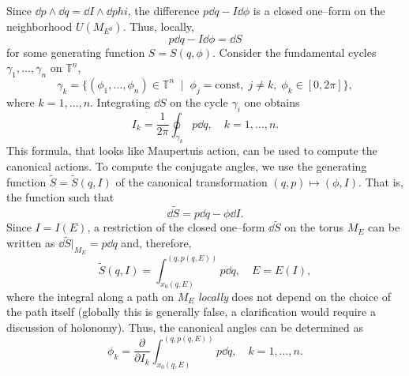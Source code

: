\documentclass[english,fontsize=11pt,paper=b5]{scrbook}
\theoremstyle{definition}
\begin{document}
      Since $\dd{p} \wedge \dd {q} = \dd{I} \wedge \dd {phi}$, the difference $p\dd q - I\dd \phi$ is a closed one--form on the neighborhood $U(M_{E^0})$. Thus, locally,
      \begin{equation}
        p\dd{q} - I\dd{\phi} = \dd{S}
      \end{equation}
      for some generating function $S = S(q,\phi)$.
      Consider the fundamental cycles $\gamma_1, \ldots, \gamma_n$ on $\mathbb{T}^n$,
      \begin{equation}
        \gamma_k = \big\{
          (\phi_1, \ldots, \phi_n) \in \mathbb{T}^n \;\mid\; \phi_j = \mathrm{const}, \; j\neq k,\; \phi_k \in [0,2\pi]
        \big\},
      \end{equation}
      where $k=1,\ldots,n$.
      Integrating $\dd S$ on the cycle $\gamma_i$ one obtains
      \begin{equation}
        I_k = \frac1{2\pi} \oint_{\gamma_k} p \dd{q}, \quad k=1,\ldots,n.
      \end{equation}
      This formula, that looks like Maupertuis action, can be used to compute the canonical actions.
      To compute the conjugate angles, we use the generating function $\widetilde S = \widetilde S(q,I)$ of the canonical transformation $(q,p) \mapsto (\phi, I)$. That is, the function such that
      \begin{equation}
        \dd{\widetilde{S}} = p\dd{q} - \phi \dd{I}.
      \end{equation}
      Since $I = I(E)$, a restriction of the closed one--form $\dd{\widetilde S}$ on the torus $M_E$ can be written as $\dd{\widetilde S}\big|_{M_E} = p\dd{q}$ and, therefore,
      \begin{equation}
        \widetilde S(q,I) = \int_{x_0(q,E)}^{(q, p(q,E))} p \dd{q}, \quad E = E(I),
      \end{equation}
      where the integral along a path on $M_E$ \emph{locally} does not depend on the choice of the path itself (globally this is generally false, a clarification would require a discussion of holonomy).
      Thus, the canonical angles can be determined as
      \begin{equation}
        \phi_k = \frac{\partial}{\partial I_k} \int_{x_0(q,E)}^{(q, p(q,E))} p \dd q, \quad k=1,\ldots,n.
      \end{equation}
\end{document}

